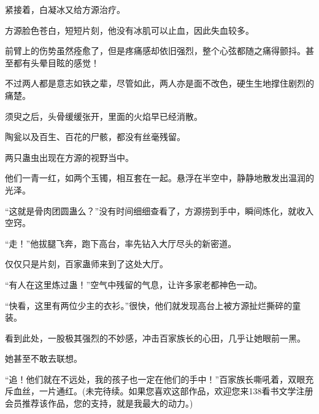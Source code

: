 \begin{this_body}
紧接着，白凝冰又给方源治疗。

方源脸色苍白，短短片刻，他没有冰肌可以止血，因此失血较多。

前臂上的伤势虽然痊愈了，但是疼痛感却依旧强烈，整个心弦都随之痛得颤抖。甚至都有头晕目眩的感觉！

不过两人都是意志如铁之辈，尽管如此，两人亦是面不改色，硬生生地撑住剧烈的痛楚。

须臾之后，头骨缓缓张开，里面的火焰早已经消散。

陶瓮以及百生、百花的尸骸，都没有丝毫残留。

两只蛊虫出现在方源的视野当中。

他们一青一红，如两个玉镯，相互套在一起。悬浮在半空中，静静地散发出温润的光泽。

“这就是骨肉团圆蛊么？”没有时间细细查看了，方源捞到手中，瞬间炼化，就收入空窍。

“走！”他拔腿飞奔，跑下高台，率先钻入大厅尽头的新密道。

仅仅只是片刻，百家蛊师来到了这处大厅。

“有人在这里炼过蛊！”空气中残留的气息，让许多家老都神色一动。

“快看，这里有两位少主的衣衫。”很快，他们就发现高台上被方源扯烂撕碎的童装。

看到此处，一股极其强烈的不妙感，冲击百家族长的心田，几乎让她眼前一黑。

她甚至不敢去联想。

“追！他们就在不远处，我的孩子也一定在他们的手中！”百家族长嘶吼着，双眼充斥血丝，一片通红。(未完待续。如果您喜欢这部作品，欢迎您来138看书文学注册会员推荐该作品，您的支持，就是我最大的动力。)

\end{this_body}

